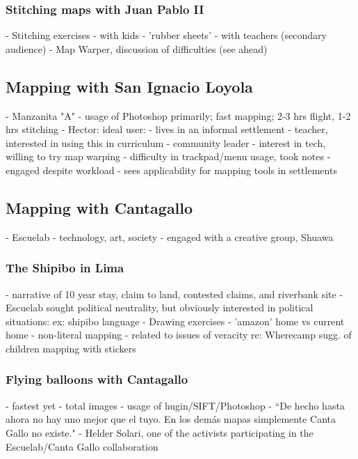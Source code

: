 \documentclass[11pt]{report}
\begin{document}
\subsubsection{Stitching maps with Juan Pablo II}
                - Stitching exercises
                    - with kids - 'rubber sheets'
                        - with teachers (secondary audience) - Map Warper, discussion of difficulties (see ahead)

\subsection{Mapping with San Ignacio Loyola}
            - Manzanita "A"
            - usage of Photoshop primarily; fast mapping; 2-3 hrs flight, 1-2 hrs stitching
            - Hector: ideal user: 
                - lives in an informal settlement
                - teacher, interested in using this in curriculum
                - community leader
                - interest in tech, willing to try map warping
                    - difficulty in trackpad/menu usage, took notes
                - engaged despite workload
                - sees applicability for mapping tools in settlements

\subsection{Mapping with Cantagallo}
            - Escuelab - technology, art, society
            - engaged with a creative group, Shuawa
\subsubsection{The Shipibo in Lima}
            - narrative of 10 year stay, claim to land, contested claims, and riverbank site
            - Escuelab sought political neutrality, but obviously interested in political situations: ex: shipibo language            - Drawing exercises
                - 'amazon' home vs current home
                - non-literal mapping - related to issues of veracity re: Wherecamp sugg. of children mapping with stickers
\subsubsection{Flying balloons with Cantagallo}
- fastest yet
                - total images
                - usage of hugin/SIFT/Photoshop
	- ``De hecho hasta ahora no hay uno mejor que el tuyo. En los demás mapas simplemente Canta Gallo no existe." - Helder Solari, one of the activists participating in the Escuelab/Canta Gallo collaboration
\end{document}

